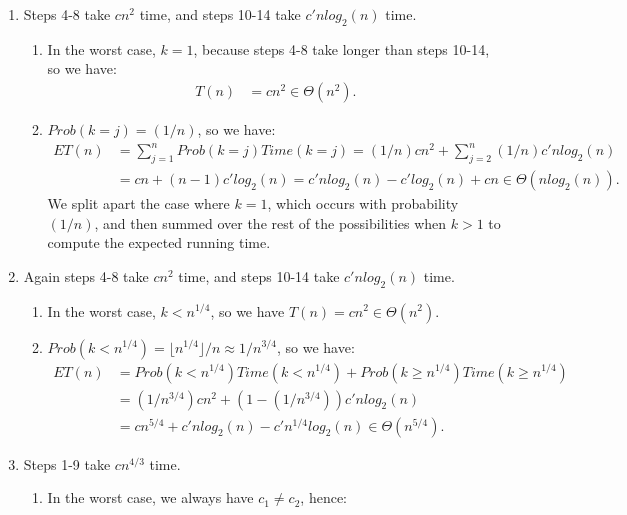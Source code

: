 \documentclass[10pt,oneside,reqno]{amsart}
\theoremstyle{plain}
\theoremstyle{definition}
\begin{document}
\begin{enumerate}[label=\arabic*.]
\item Steps 4-8 take $cn^2$ time, and steps 10-14 take $c'nlog_2(n)$ time. 
\begin{enumerate}
\item In the worst case, $k = 1$, because steps 4-8 take longer than steps 10-14, so we have:
\begin{equation}
\begin{aligned}
T(n) &= cn^2 \in \Theta(n^2). 
\end{aligned}
\end{equation}
\item $Prob(k = j) = (1/n)$, so we have:
\begin{equation}
\begin{aligned}
ET(n) &= \sum_{j = 1}^n Prob(k = j)Time(k = j) = (1/n)cn^2 + \sum_{j = 2}^n(1/n)c'nlog_2(n)\\
&= cn + (n - 1)c'log_2(n) = c'nlog_2(n) - c'log_2(n) + cn \in \Theta(nlog_2(n)). 
\end{aligned}
\end{equation}
We split apart the case where $k = 1$, which occurs with probability $(1/n)$, and then summed over the rest of the possibilities when $k > 1$ to compute the expected running time. \\
\end{enumerate}
\item Again steps 4-8 take $cn^2$ time, and steps 10-14 take $c'nlog_2(n)$ time. 
\begin{enumerate}
\item In the worst case, $k<n^{1/4}$, so we have $T(n) = cn^2 \in \Theta(n^2)$. 
\item $Prob(k < n^{1/4}) = \lfloor n^{1/4} \rfloor/n \approx 1/n^{3/4}$, so we have:
\begin{equation}
\begin{aligned}
ET(n) &= Prob(k < n^{1/4})Time(k < n^{1/4}) + Prob(k \geq n^{1/4})Time(k \geq n^{1/4})\\
&= (1/n^{3/4})cn^2 + (1 - (1/n^{3/4}))c'nlog_2(n)
\\
 &= cn^{5/4} + c'nlog_2(n) - c'n^{1/4}log_2(n) \in \Theta(n^{5/4}). 
\end{aligned}
\end{equation}
\end{enumerate}
\item Steps 1-9 take $cn^{4/3}$ time. 
\begin{enumerate}
\item In the worst case, we always have $c_1 \neq c_2$, hence: 
\begin{equation}

\end{equation}
\end{enumerate}
\end{enumerate}
\end{document}
